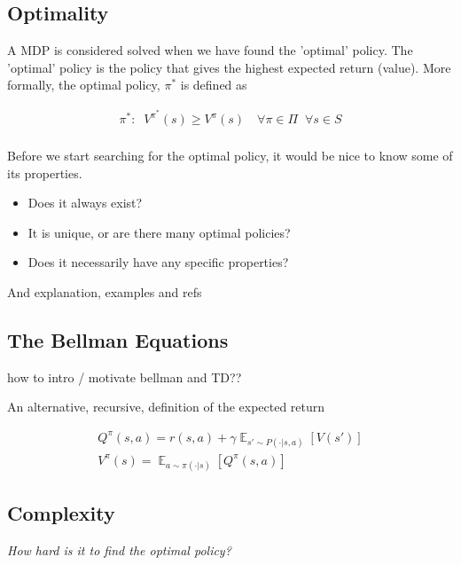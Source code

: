 \subsection{Optimality}

A MDP is considered solved when we have found the 'optimal' policy. The 'optimal'
policy is the policy that gives the highest
expected return (value). More formally, the optimal policy, $\pi^{* }$ is defined as

\begin{align*}
\pi^{*} : \;\; V^{\pi^* }(s) \ge V^{\pi}(s) \quad \forall \pi\in \Pi \;\;\forall s\in S\\
\end{align*}

Before we start searching for the optimal policy, it would be nice to know some of its properties.

\begin{itemize}
\tightlist
  \item Does it always exist?
  \item It is unique, or are there many optimal policies?
  \item Does it necessarily have any specific properties?
\end{itemize}

{\color{red} And explanation, examples and refs}

\subsection{The Bellman Equations}

{\color{red}how to intro / motivate bellman and TD??}

An alternative, recursive, definition of the expected return


\begin{align*}
Q^{\pi}(s, a) = r(s, a) + \gamma \mathop{\mathbb E}_{s' \sim P(\cdot|s, a)} [V(s')] \label{eq:bellman-eqn}\tag{Bellman equation}\\
V^{\pi}(s) = \mathop{\mathbb E}_{a \sim \pi(\cdot|s)} [Q^{\pi}(s, a)]
\end{align*}


\subsection{Complexity}

\begin{displayquote}
  \textit{How hard is it to find the optimal policy?}
\end{displayquote}

